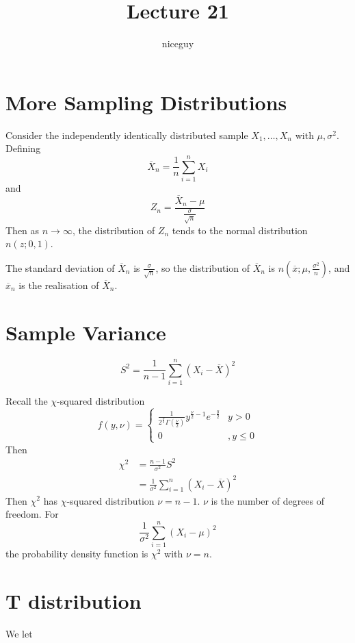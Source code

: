 \documentclass[12pt]{article}
\author{niceguy}
\title{Lecture 21}
\begin{document}
\maketitle

\section{More Sampling Distributions}

\begin{thm}
	Consider the independently identically distributed sample $X_1,\dots,X_n$ with $\mu,\sigma^2$. Defining
	$$\overline{X}_n = \frac{1}{n} \sum_{i=1}^n X_i$$
	and
	$$Z_n = \frac{\overline{X}_n-\mu}{\frac{\sigma}{\sqrt{n}}}$$
	Then as $n \rightarrow \infty$, the distribution of $Z_n$ tends to the normal distribution $n(z;0,1)$.
\end{thm}

The standard deviation of $\overline{X}_n$ is $\frac{\sigma}{\sqrt{n}}$, so the distribution of $\overline{X}_n$ is $n(\overline{x};\mu,\frac{\sigma^2}{n})$, and $\overline{x}_n$ is the realisation of $\overline{X}_n$.

\section{Sample Variance}

$$S^2 = \frac{1}{n-1} \sum_{i=1}^n (X_i - \overline{X})^2$$

Recall the $\chi$-squared distribution
$$f(y,\nu) = \begin{cases} \frac{1}{2^{\frac{\nu}{2}}\Gamma\left(\frac{\nu}{2}\right)}y^{\frac{\nu}{2}-1}e^{-\frac{y}{2}} & y > 0 \\ 0 & , y \leq 0 \end{cases}$$
Then
\begin{align*}
	\chi^2 &= \frac{n-1}{\sigma^2} S^2 \\
	       &= \frac{1}{\sigma^2} \sum_{i=1}^n (X_i - \overline{X})^2
\end{align*}
Then $\chi^2$ has $\chi$-squared distribution $\nu = n-1$. $\nu$ is the number of degrees of freedom. For
$$\frac{1}{\sigma^2} \sum_{i=1}^n (X_i - \mu)^2$$
the probability density function is $\chi^2$ with $\nu = n$.

\section{T distribution}

We let
\end{document}
